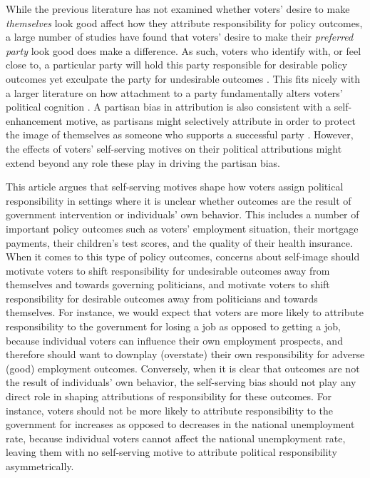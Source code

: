 \documentclass[a4paper,11pt]{article}
\begin{document}
	While the previous literature has not examined whether voters' desire to make \textit{themselves} look good affect how they attribute responsibility for policy outcomes, a large number of studies have found that voters' desire to make their \textit{preferred party} look good does make a difference. As such, voters who identify with, or feel close to, a particular party will hold this party responsible for desirable policy outcomes yet exculpate the party for undesirable outcomes \citep{rudolph2003s,rudolph2006triangulating,malhotra2008attributing,marsh2010attribution,tilley2011government,bisgaard2015bias,healy2014partisan}. This fits nicely with a larger literature on how attachment to a party fundamentally alters voters' political cognition \citep[e.g.,][]{campbell1960american}. A partisan bias in attribution is also consistent with a self-enhancement motive, as partisans might selectively attribute in order to protect the image of themselves as someone who supports a successful party \citep[for an argument along these lines, see][319]{tilley2011government}. However, the effects of voters' self-serving motives on their political attributions might extend beyond any role these play in driving the partisan bias.
	
	
	This article argues that self-serving motives shape how voters assign political responsibility in settings where it is unclear whether outcomes are the result of government intervention or individuals' own behavior. This includes a number of important policy outcomes such as voters' employment situation, their mortgage payments, their children's test scores, and the quality of their health insurance. When it comes to this type of policy outcomes, concerns about self-image should motivate voters to shift responsibility for undesirable outcomes away from themselves and towards governing politicians, and motivate voters to shift responsibility for desirable outcomes away from politicians and towards themselves. For instance, we would expect that voters are more likely to attribute responsibility to the government for losing a job as opposed to getting a job, because individual voters can influence their own employment prospects, and therefore should want to downplay (overstate) their own responsibility for adverse (good) employment outcomes. Conversely, when it is clear that outcomes are not the result of individuals' own behavior, the self-serving bias should not play any direct role in shaping attributions of responsibility for these outcomes. For instance, voters should not be more likely to attribute responsibility to the government for increases as opposed to decreases in the national unemployment rate, because individual voters cannot affect the national unemployment rate, leaving them with no self-serving motive to attribute political responsibility asymmetrically.
	
\end{document}
